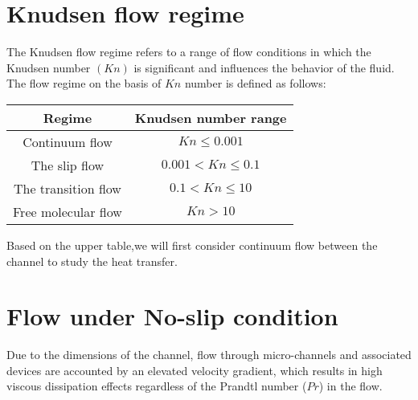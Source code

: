 \documentclass[14pt,one side, a4paper]{extbook}
\begin{document}
	  \section{Knudsen flow regime}
	 The Knudsen flow regime refers to a range of flow conditions in which the Knudsen number $(Kn)$ is significant and influences the behavior of the fluid\cite{dimitris}.\\
	 The flow regime on the basis of $Kn$ number is defined as follows:
	\begin{center}
		\begin{tabular}{||c | c ||}
			\hline
	 	Regime & Knudsen number range \\
	 	\hline
	 	Continuum flow & $Kn\leq 0.001$ \\
	 	\hline
	 	The slip flow &  $0.001 < Kn \leq 0.1$\\
	 	\hline
	 	The transition flow & $0.1 < Kn \leq 10$\\
	 	\hline
	 	Free molecular flow &  $Kn > 10$  \\
	 	[1ex]
	 	\hline
	 	\end{tabular}
	 	\end{center}
	 	Based on the upper table,we will first consider continuum flow between the channel to study the heat transfer.
	 	\section{Flow under No-slip condition} Due to the dimensions of the channel, flow through micro-channels and associated devices are accounted by an elevated velocity gradient\cite{Richardson}, which\hspace*{0.2cm} results\hspace*{0.2cm} in\hspace*{0.2cm} high viscous dissipation effects regardless of the Prandtl number ($Pr$) in the flow\cite{mukharjee}.  
\end{document}

